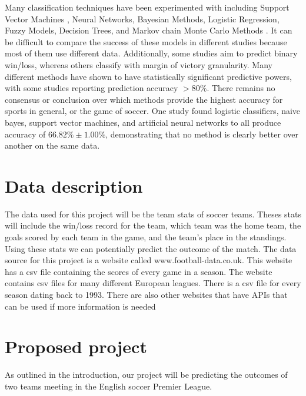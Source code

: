 \documentclass[conference]{IEEEtran}
\begin{document}
 Many classification techniques have been experimented with including Support Vector Machines \cite{Cao:2012aa}, Neural Networks\cite{McCabe:2008aa}, Bayesian Methods\cite{Buursma:2011aa}, Logistic Regression\cite{Cao:2012aa,Buursma:2011aa}, Fuzzy Models\cite{Trawinski:2010aa}, Decision Trees\cite{Zdravevski:2010aa}, and Markov chain Monte Carlo Methods \cite{Rue:2000aa}. It can be difficult to compare the success of these models in different studies because most of them use different data. Additionally, some studies aim to predict binary win/loss, whereas others \cite{Rotshtein:2005aa} classify with margin of victory granularity. Many different methods have shown to have statistically significant predictive powers, with some studies reporting prediction accuracy $>80\%$\cite{Ivankovic:2010aa}. There remains no consensus or conclusion over which methods provide the highest accuracy for sports in general, or the game of soccer. One study \cite{Cao:2012aa} found logistic classifiers, naive bayes, support vector machines, and artificial neural networks to all produce accuracy of $66.82\% \pm 1.00\%$, demonstrating that no method is clearly better over another on the same data.






\section{Data description}
The data used for this project will be the team stats of soccer teams. Theses stats will include the win/loss record for the team, which team was the home team, the goals scored by each team in the game, and the team’s place in the standings. Using these stats we can potentially predict the outcome of the match.
The data source for this project is a website called www.football-data.co.uk. This website has a csv file containing the scores of every game in a season. The website contains csv files for many different European leagues. There is a csv file for every season dating back to 1993. There are also other websites that have APIs that can be used if more information is needed

\section{Proposed project}
As outlined in the introduction, our project will be predicting the outcomes of two teams meeting in the English soccer Premier League.
\end{document}
